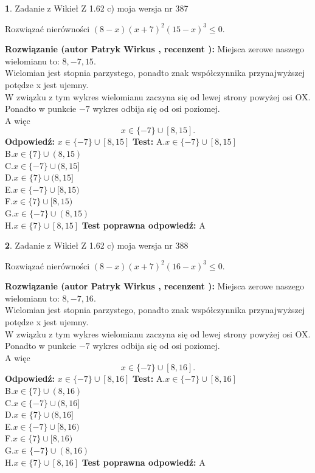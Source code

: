 \documentclass[12pt, a4paper]{article}
\theoremstyle{definition} %
\newtheorem{zad}{}
\newcommand{\zadStart}[1]{\begin{zad}#1\newline}
\newcommand{\zadStop}{\end{zad}}
\newcommand{\rozwStart}[2]{\noindent \textbf{Rozwiązanie (autor #1 , recenzent #2): }\newline}
\newcommand{\rozwStop}{\newline}
\newcommand{\odpStart}{\noindent \textbf{Odpowiedź:}\newline}
\newcommand{\odpStop}{\newline}
\newcommand{\testStart}{\noindent \textbf{Test:}\newline}
\newcommand{\testStop}{\newline}
\newcommand{\kluczStart}{\noindent \textbf{Test poprawna odpowiedź:}\newline}
\newcommand{\kluczStop}{\newline}
\begin{document}
\zadStart{Zadanie z Wikieł Z 1.62 c) moja wersja nr 387}

Rozwiązać nierówności $(8-x)(x+7)^{2}(15-x)^{3}\le0$.
\zadStop
\rozwStart{Patryk Wirkus}{}
Miejsca zerowe naszego wielomianu to: $8, -7, 15$.\\
Wielomian jest stopnia parzystego, ponadto znak współczynnika przy\linebreak najwyższej potędze x jest ujemny.\\ W związku z tym wykres wielomianu zaczyna się od lewej strony powyżej osi OX.\\
Ponadto w punkcie $-7$ wykres odbija się od osi poziomej.\\
A więc $$x \in \{-7\} \cup [8,15].$$
\rozwStop
\odpStart
$x \in \{-7\} \cup [8,15]$
\odpStop
\testStart
A.$x \in \{-7\} \cup [8,15]$\\
B.$x \in \{7\} \cup (8,15)$\\
C.$x \in \{-7\} \cup (8,15]$\\
D.$x \in \{7\} \cup (8,15]$\\
E.$x \in \{-7\} \cup [8,15)$\\
F.$x \in \{7\} \cup [8,15)$\\
G.$x \in \{-7\} \cup (8,15)$\\
H.$x \in \{7\} \cup [8,15]$
\testStop
\kluczStart
A
\kluczStop



\zadStart{Zadanie z Wikieł Z 1.62 c) moja wersja nr 388}

Rozwiązać nierówności $(8-x)(x+7)^{2}(16-x)^{3}\le0$.
\zadStop
\rozwStart{Patryk Wirkus}{}
Miejsca zerowe naszego wielomianu to: $8, -7, 16$.\\
Wielomian jest stopnia parzystego, ponadto znak współczynnika przy\linebreak najwyższej potędze x jest ujemny.\\ W związku z tym wykres wielomianu zaczyna się od lewej strony powyżej osi OX.\\
Ponadto w punkcie $-7$ wykres odbija się od osi poziomej.\\
A więc $$x \in \{-7\} \cup [8,16].$$
\rozwStop
\odpStart
$x \in \{-7\} \cup [8,16]$
\odpStop
\testStart
A.$x \in \{-7\} \cup [8,16]$\\
B.$x \in \{7\} \cup (8,16)$\\
C.$x \in \{-7\} \cup (8,16]$\\
D.$x \in \{7\} \cup (8,16]$\\
E.$x \in \{-7\} \cup [8,16)$\\
F.$x \in \{7\} \cup [8,16)$\\
G.$x \in \{-7\} \cup (8,16)$\\
H.$x \in \{7\} \cup [8,16]$
\testStop
\kluczStart
A
\kluczStop
\end{document}
